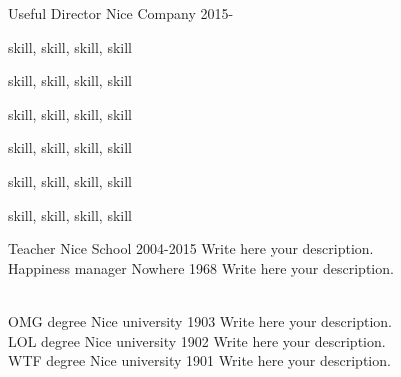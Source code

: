 \documentclass[11pt]{strongalecv}
\begin{document}
    





    \begin{MainPart}

    \Experience
        {\ColorTextMain}
		{Useful Director}
		{Nice Company}
        {2015-\faUndo}
        {   
            \begin{ItemList}{\ColorHighlight}
                \item [\faCode] skill, skill, skill, skill
                \item [\faFileCodeO]  skill, skill, skill, skill
                \item [\faCubes]  skill, skill, skill, skill
                \item [\faPencilSquareO]  skill, skill, skill, skill
                \item [\faVideoCamera]  skill, skill, skill, skill
                \item [\faGear]  skill, skill, skill, skill
            \end{ItemList}
        }
    \Experience
        {\ColorHighlight}
		{Teacher}
		{Nice School}
        {2004-2015}
        {   
            Write here your description.\\
            \lorem
        }
    \Experience
        {\ColorHighlight}
		{Happiness manager}
		{Nowhere}
        {1968}
        {   
            Write here your description.\\
            \lorem\\
            \lorem
        }


    
    \Experience
        {\ColorHighlight}
		{OMG degree}
		{Nice university}
        {1903}
        {   
            Write here your description.\\
            \lorem
        }
    \Experience
        {\ColorHighlight}
		{LOL degree}
		{Nice university}
        {1902}
        {   
            Write here your description.\\
            \lorem
        }
    \Experience
        {\ColorHighlight}
		{WTF degree}
		{Nice university}
        {1901}
        {   
            Write here your description.\\
            \lorem\\
            \lorem
        }



\end{MainPart}
\end{document}
